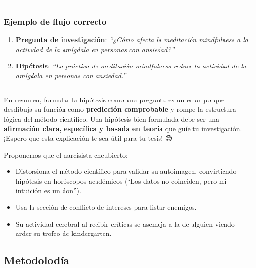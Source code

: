 \documentclass[
  10pt]{article}
\providecommand{\tightlist}{%
  \setlength{\itemsep}{0pt}\setlength{\parskip}{0pt}}\usepackage{longtable,booktabs,array}
\begin{document}
\begin{tcolorbox}
\begin{center}\rule{0.5\linewidth}{0.5pt}\end{center}

\subsubsection{\texorpdfstring{\textbf{Ejemplo de flujo
correcto}}{Ejemplo de flujo correcto}}\label{ejemplo-de-flujo-correcto}

\begin{enumerate}
\def\labelenumi{\arabic{enumi}.}
\tightlist
\item
  \textbf{Pregunta de investigación}: \emph{``¿Cómo afecta la meditación
  mindfulness a la actividad de la amígdala en personas con
  ansiedad?''}\\
\item
  \textbf{Hipótesis}: \emph{``La práctica de meditación mindfulness
  reduce la actividad de la amígdala en personas con ansiedad.''}
\end{enumerate}

\begin{center}\rule{0.5\linewidth}{0.5pt}\end{center}

En resumen, formular la hipótesis como una pregunta es un error porque
desdibuja su función como \textbf{predicción comprobable} y rompe la
estructura lógica del método científico. Una hipótesis bien formulada
debe ser una \textbf{afirmación clara, específica y basada en teoría}
que guíe tu investigación. ¡Espero que esta explicación te sea útil para
tu tesis! 😊

\end{tcolorbox}

Proponemos que el narcisista encubierto:

\begin{itemize}
\tightlist
\item
  Distorsiona el método científico para validar su autoimagen,
  convirtiendo hipótesis en horóscopos académicos (``Los datos no
  coinciden, pero mi intuición es un don'').
\item
  Usa la sección de conflicto de intereses para listar enemigos.
\item
  Su actividad cerebral al recibir críticas se asemeja a la de alguien
  viendo arder su trofeo de kindergarten.
\end{itemize}

\subsection{Metodolodía}\label{metodoloduxeda}
\end{document}
